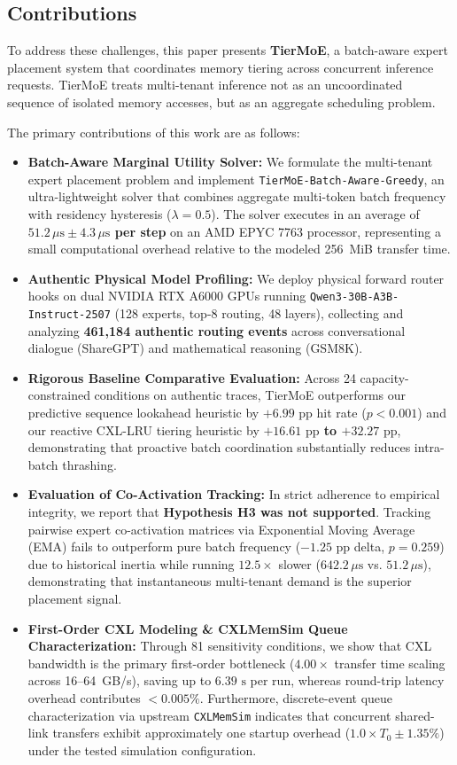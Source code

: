\documentclass[10pt,journal,compsoc]{IEEEtran}
\begin{document}
\subsection{Contributions}
To address these challenges, this paper presents \textbf{TierMoE}, a batch-aware expert placement system that coordinates memory tiering across concurrent inference requests. TierMoE treats multi-tenant inference not as an uncoordinated sequence of isolated memory accesses, but as an aggregate scheduling problem. 

The primary contributions of this work are as follows:
\begin{itemize}
    \item \textbf{Batch-Aware Marginal Utility Solver:} We formulate the multi-tenant expert placement problem and implement \texttt{TierMoE-Batch-Aware-Greedy}, an ultra-lightweight solver that combines aggregate multi-token batch frequency with residency hysteresis ($\lambda = 0.5$). The solver executes in an average of \textbf{$51.2\,\mu\text{s} \pm 4.3\,\mu\text{s}$ per step} on an AMD EPYC 7763 processor, representing a small computational overhead relative to the modeled 256~MiB transfer time.
    \item \textbf{Authentic Physical Model Profiling:} We deploy physical forward router hooks on dual NVIDIA RTX A6000 GPUs running \texttt{Qwen3-30B-A3B-Instruct-2507} (128 experts, top-8 routing, 48 layers), collecting and analyzing \textbf{461,184 authentic routing events} across conversational dialogue (ShareGPT) and mathematical reasoning (GSM8K).
    \item \textbf{Rigorous Baseline Comparative Evaluation:} Across 24 capacity-constrained conditions on authentic traces, TierMoE outperforms our predictive sequence lookahead heuristic by \textbf{$+6.99\text{ pp}$} hit rate ($p < 0.001$) and our reactive CXL-LRU tiering heuristic by \textbf{$+16.61\text{ pp}$ to $+32.27\text{ pp}$}, demonstrating that proactive batch coordination substantially reduces intra-batch thrashing.
    \item \textbf{Evaluation of Co-Activation Tracking:} In strict adherence to empirical integrity, we report that \textbf{Hypothesis H3 was not supported}. Tracking pairwise expert co-activation matrices via Exponential Moving Average (EMA) fails to outperform pure batch frequency ($-1.25\text{ pp}$ delta, $p=0.259$) due to historical inertia while running $12.5\times$ slower ($642.2\,\mu\text{s}$ vs. $51.2\,\mu\text{s}$), demonstrating that instantaneous multi-tenant demand is the superior placement signal.
    \item \textbf{First-Order CXL Modeling \& CXLMemSim Queue Characterization:} Through 81 sensitivity conditions, we show that CXL bandwidth is the primary first-order bottleneck ($4.00\times$ transfer time scaling across 16--64~GB/s), saving up to $6.39\text{ s}$ per run, whereas round-trip latency overhead contributes $< 0.005\%$. Furthermore, discrete-event queue characterization via upstream \texttt{CXLMemSim} indicates that concurrent shared-link transfers exhibit approximately one startup overhead ($1.0 \times T_0 \pm 1.35\%$) under the tested simulation configuration.
\end{itemize}
\end{document}

